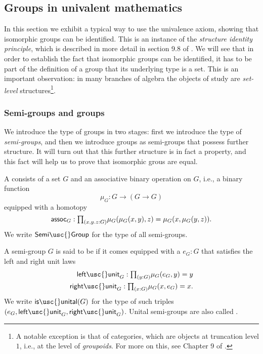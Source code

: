 \subsection{Groups in univalent mathematics}

In this section we exhibit a typical way to use the univalence axiom, showing that isomorphic groups can be identified.
This is an instance of the \emph{structure identity principle}, which is described in more detail in section 9.8 of \cite{hottbook}.
We will see that in order to establish the fact that isomorphic groups can be identified, it has to be part of the definition of a group that its underlying type is a set. This is an important observation: in many branches of algebra the objects of study are \emph{set-level} structures\footnote{A notable exception is that of categories, which are objects at truncation level $1$, i.e., at the level of \emph{groupoids}. For more on this, see Chapter 9 of \cite{hottbook}.}.

\subsubsection{Semi-groups and groups}
We introduce the type of groups in two stages: first we introduce the type of \emph{semi-groups}, and then we introduce groups as semi-groups that possess further structure. It will turn out that this further structure is in fact a property, and this fact will help us to prove that isomorphic grous are equal.

\begin{defn}
  A  consists of a set $G$ and an associative binary operation on $G$, i.e., a binary function
  \begin{equation*}
    \mu_G : G \to (G \to G)
  \end{equation*}
  equipped with a homotopy
  \begin{equation*}
    \mathsf{assoc}_G : \prd{x,y.z:G}\mu_G(\mu_G(x,y),z)=\mu_G(x,\mu_G(y,z)).
  \end{equation*}
  We write $\mathsf{Semi\usc{}Group}$ for the type of all semi-groups.
\end{defn}

\begin{defn}
  A semi-group $G$ is said to be  if it comes equipped with a  $e_G:G$ that satisfies the left and right unit laws
  \begin{align*}
    \mathsf{left\usc{}unit}_G : \prd{y:G}\mu_G(e_G,y)=y \\
    \mathsf{right\usc{}unit}_G : \prd{x:G}\mu_G(x,e_G)=x.
  \end{align*}
  We write $\mathsf{is\usc{}unital}(G)$ for the type of such triples $(e_G,\mathsf{left\usc{}unit}_G,\mathsf{right\usc{}unit}_G)$. Unital semi-groups are also called .
\end{defn}

